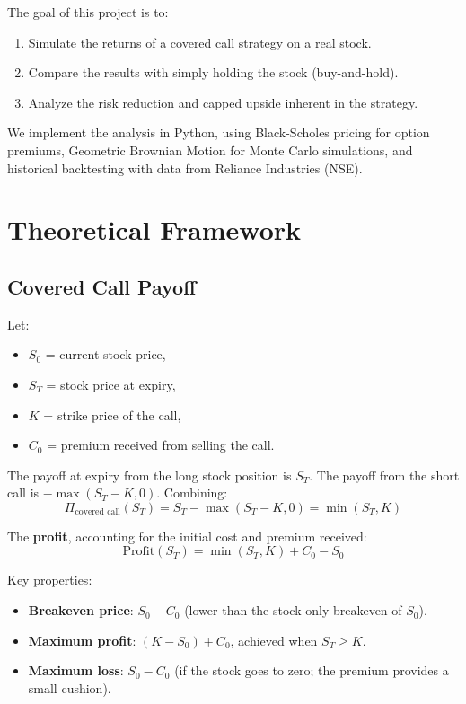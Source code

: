 \documentclass[12pt, a4paper]{article}
\begin{document}
The goal of this project is to:
\begin{enumerate}
    \item Simulate the returns of a covered call strategy on a real stock.
    \item Compare the results with simply holding the stock (buy-and-hold).
    \item Analyze the risk reduction and capped upside inherent in the strategy.
\end{enumerate}

We implement the analysis in Python, using Black-Scholes pricing for option premiums, Geometric Brownian Motion for Monte Carlo simulations, and historical backtesting with data from Reliance Industries (NSE).

\section{Theoretical Framework}

\subsection{Covered Call Payoff}

Let:
\begin{itemize}
    \item $S_0$ = current stock price,
    \item $S_T$ = stock price at expiry,
    \item $K$ = strike price of the call,
    \item $C_0$ = premium received from selling the call.
\end{itemize}

The payoff at expiry from the long stock position is $S_T$. The payoff from the short call is $-\max(S_T - K, 0)$. Combining:
\begin{equation}
    \Pi_{\text{covered call}}(S_T) = S_T - \max(S_T - K, 0) = \min(S_T, K)
\end{equation}

The \textbf{profit}, accounting for the initial cost and premium received:
\begin{equation}
    \text{Profit}(S_T) = \min(S_T, K) + C_0 - S_0
\end{equation}

Key properties:
\begin{itemize}
    \item \textbf{Breakeven price}: $S_0 - C_0$ (lower than the stock-only breakeven of $S_0$).
    \item \textbf{Maximum profit}: $(K - S_0) + C_0$, achieved when $S_T \geq K$.
    \item \textbf{Maximum loss}: $S_0 - C_0$ (if the stock goes to zero; the premium provides a small cushion).
\end{itemize}
\end{document}

